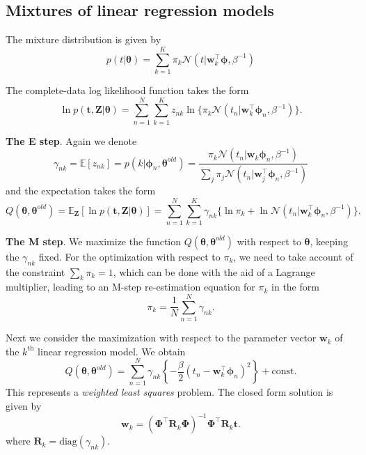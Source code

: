 \documentclass[a4paper]{report}
\newcommand{\up}{\mathrm}
\renewcommand{\bf}{\mathbf}
\renewcommand{\cal}{\mathcal}
\newcommand{\bb}{\mathbb}
\newcommand{\imp}[1]{{\color{blue}\textit{#1}}}
\newcommand{\bs}{\boldsymbol}
\begin{document}
\subsection{Mixtures of linear regression models}
The mixture distribution is given by
\begin{equation}
	p(t|\bs{\theta}) = \sum_{k=1}^K \pi_k \cal{N}(t|\bf{w}_k^{\intercal} \bs{\phi},\beta^{-1})
\end{equation}

The complete-data log likelihood function takes the form
\begin{equation}
	\ln p(\bf{t,Z}|\bs{\theta}) = \sum_{n=1}^N \sum_{k=1}^K z_{nk}\ln \{ \pi_k \cal{N}(t_n|\bf{w}_k^{\intercal} \bs{\phi}_n,\beta^{-1}) \}.
\end{equation}

\textbf{The E step}. Again we denote
\begin{equation}
	\gamma_{nk} = \bb{E}[z_{nk}] = p(k|\bs{\phi}_n,\bs{\theta}^{old}) = \frac{\pi_k \cal{N}(t_n|\bf{w}_k\bs{\phi}_n,\beta^{-1})}{\sum_j \pi_j \cal{N}(t_n|\bf{w}_j^{\intercal} \bs{\phi}_n,\beta^{-1})}
\end{equation}
and the expectation takes the form
\begin{equation}
	Q(\bs{\theta},\bs{\theta}^{old}) = \bb{E}_{\bf{Z}}[\ln p(\bf{t,Z}|\bs{\theta})] = \sum_{n=1}^N \sum_{k=1}^K \gamma_{nk}\{ \ln \pi_k + \ln \cal{N}(t_n|\bf{w}_k^{\intercal}\bs{\phi}_n,\beta^{-1}) \}.
\end{equation}

\textbf{The M step}. We maximize the function $Q(\bs{\theta},\bs{\theta}^{old})$ with respect to $\bs{\theta}$, keeping the $\gamma_{nk}$ fixed. For the optimization with respect to $\pi_k$, we need to take account of the constraint $\sum_k \pi_k=1$, which can be done with the aid of a Lagrange multiplier, leading to an M-step re-estimation equation for $\pi_k$ in the form
\begin{equation}
	\pi_k = \frac{1}{N} \sum_{n=1}^N \gamma_{nk}.
\end{equation}

Next we consider the maximization with respect to the parameter vector $\bf{w}_k$ of the $k^{\up{th}}$ linear regression model. We obtain
\begin{equation}
	Q(\bs{\theta},\bs{\theta}^{old}) = \sum_{n=1}^N \gamma_{nk} \left\{ -\frac{\beta}{2} (t_n - \bf{w}_k^{\intercal} \bs{\phi}_n)^2 \right\} + \up{const}.
\end{equation}
This represents a \imp{weighted least squares} problem. The closed form solution is given by
\begin{equation}
	\bf{w}_k = (\bs{\Phi}^{\intercal} \bf{R}_k \bs{\Phi})^{-1} \bs{\Phi}^{\intercal} \bf{R}_k \bf{t}.
\end{equation}
where $\bf{R}_k = \up{diag}(\gamma_{nk})$.
\end{document}
